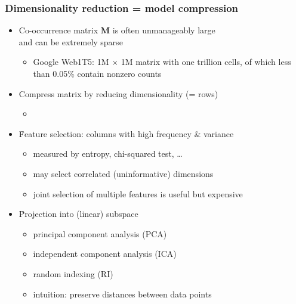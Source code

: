 \documentclass[t]{beamer} %
\begin{document}
\begin{frame}
  \frametitle{Dimensionality reduction = model compression}

  \begin{itemize}
  \item Co-occurrence matrix $\mathbf{M}$ is often unmanageably large\\
    and can be extremely sparse
    \begin{itemize}
    \item Google Web1T5: 1M $\times$ 1M matrix with one trillion
      cells, of which less than 0.05\% contain nonzero counts \citep{Evert:10a}
    \end{itemize}
  \item[\So] Compress matrix by reducing dimensionality (= rows)
    \begin{itemize}
    \item[]\pause
    \end{itemize}
  \item \h{Feature selection}: columns with high frequency \& variance
    \begin{itemize}
    \item measured by entropy, chi-squared test, \ldots
    \item may select correlated (\so uninformative) dimensions
    \item joint selection of multiple features is useful but expensive
    \end{itemize}
    \pause
  \item \h{Projection} into (linear) subspace
    \begin{itemize}
    \item principal component analysis (PCA)
    \item independent component analysis (ICA)
    \item random indexing (RI)
    \item[\hand] intuition: preserve distances between data points
    \end{itemize}
  \end{itemize}
\end{frame}
\end{document}
